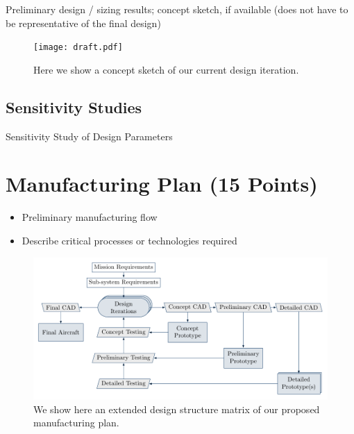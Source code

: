 \documentclass[proposal]{byu-aero}
\begin{document}
Preliminary design / sizing results; concept sketch, if available (does not have to be representative of the final design) 



\begin{figure}[h!]
	\centering
	\texttt{[image: draft.pdf]}
	\caption{Here we show a concept sketch of our current design iteration.}
	\label{fig:conceptsketch}
\end{figure}

\subsection{Sensitivity Studies}
\label{ssec:sensitivitystudies}

Sensitivity Study of Design Parameters

\section{Manufacturing Plan (15 Points)}
\label{sec:ManufacturingPlan}
\begin{itemize}
    \item Preliminary manufacturing flow
    \item Describe critical processes or technologies required
\end{itemize}

\begin{figure}[h!]
	\centering
	\includegraphics[width=4.5in]{manufacturing_flow.pdf}
	\caption{We show here an extended design structure matrix of our proposed manufacturing plan.}
	\label{fig:manufacturingplan}
\end{figure}
\end{document}

